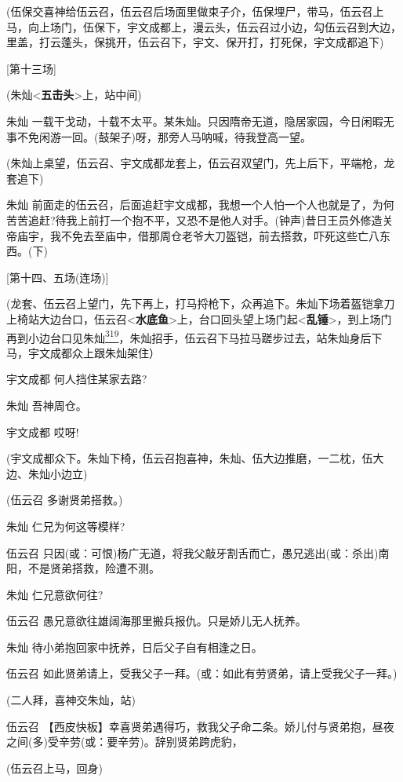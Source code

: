 (伍保交喜神给伍云召，伍云召后场面里做束子介，伍保埋尸，带马，伍云召上马，向上场门，伍保下，宇文成都上，漫云头，伍云召过小边，勾伍云召到大边，里盖，打云蓬头，保挑开，伍云召下，宇文、保开打，打死保，宇文成都追下)

{[}第十三场{]}

(朱灿\textless{}\textbf{五击头}\textgreater{}上，站中间)

朱灿
一载干戈动，十载不太平。某朱灿。只因隋帝无道，隐居家园，今日闲暇无事不免闲游一回。(鼓架子)呀，那旁人马呐喊，待我登高一望。

(朱灿上桌望，伍云召、宇文成都龙套上，伍云召双望门，先上后下，平端枪，龙套追下)

朱灿
前面走的伍云召，后面追赶宇文成都，我想一个人怕一个人也就是了，为何苦苦追赶?待我上前打一个抱不平，又恐不是他人对手。(钟声)昔日王员外修造关帝庙宇，我不免去至庙中，借那周仓老爷大刀盔铠，前去搭救，吓死这些亡八东西。(下)

{[}第十四、五场(连场){]}

(龙套、伍云召上望门，先下再上，打马捋枪下，众再追下。朱灿下场着盔铠拿刀上椅站大边台口，伍云召\textless{}\textbf{水底鱼}\textgreater{}上，台口回头望上场门起\textless{}\textbf{乱锤}\textgreater{}，到上场门再到小边台口见朱灿\protect\hyperlink{fn319}{\textsuperscript{319}}，朱灿招手，伍云召下马拉马蹉步过去，站朱灿身后下马，宇文成都众上跟朱灿架住）

宇文成都 何人挡住某家去路?

朱灿 吾神周仓。

宇文成都 哎呀!

(宇文成都众下。朱灿下椅，伍云召抱喜神，朱灿、伍大边推磨，一二枕，伍大边、朱灿小边立)

(伍云召 多谢贤弟搭救。)

朱灿 仁兄为何这等模样?

伍云召
只因(或：可恨)杨广无道，将我父敲牙割舌而亡，愚兄逃出(或：杀出)南阳，不是贤弟搭救，险遭不测。

朱灿 仁兄意欲何往?

伍云召 愚兄意欲往雄阔海那里搬兵报仇。只是娇儿无人抚养。

朱灿 待小弟抱回家中抚养，日后父子自有相逢之日。

伍云召
如此贤弟请上，受我父子一拜。(或：如此有劳贤弟，请上受我父子一拜。)

(二人拜，喜神交朱灿，站)

伍云召
【西皮快板】幸喜贤弟遇得巧，救我父子命二条。娇儿付与贤弟抱，昼夜之间(多)受辛劳(或：要辛劳)。辞别贤弟跨虎豹，

(伍云召上马，回身)

